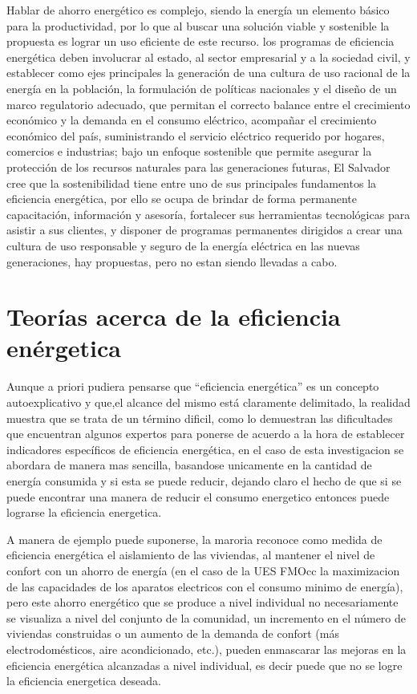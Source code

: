 \documentclass[12pt,letterpaper]{report}
\begin{document}
Hablar de ahorro energético es complejo, siendo la energía un elemento básico para la productividad, por lo que al buscar una solución viable y sostenible la propuesta es lograr un uso eficiente de este recurso. los programas de eficiencia energética deben involucrar al estado, al sector empresarial y a la sociedad civil, y establecer como ejes principales la generación de una cultura de uso racional de la energía en la población, la formulación de políticas nacionales y el diseño de un marco regulatorio adecuado, que permitan el correcto balance entre el crecimiento económico y la demanda en el consumo eléctrico, acompañar el crecimiento económico del país, suministrando el servicio eléctrico requerido por hogares, comercios e industrias; bajo un enfoque sostenible que permite asegurar la protección de los recursos naturales para las generaciones futuras, El Salvador cree que la sostenibilidad tiene entre uno de sus principales fundamentos la eficiencia energética, por ello se ocupa de brindar de forma permanente capacitación, información y asesoría, fortalecer sus herramientas tecnológicas para asistir a sus clientes, y disponer de programas permanentes dirigidos a crear una cultura de uso responsable y seguro de la energía eléctrica en las nuevas generaciones, hay propuestas, pero no estan siendo llevadas a cabo.\cite{MIESA}

\section{Teorías acerca de la eficiencia enérgetica}

Aunque a priori pudiera pensarse que “eficiencia energética” es un concepto
autoexplicativo y que,el alcance del mismo está claramente
delimitado, la realidad muestra que se trata de un término dificil, como lo
demuestran las dificultades que encuentran algunos expertos para ponerse de
acuerdo a la hora de establecer indicadores específicos de eficiencia
energética, en el caso de esta investigacion se abordara de manera mas sencilla, basandose unicamente en la cantidad de energía consumida y si esta se puede reducir, dejando claro el hecho de que si se puede encontrar una manera de reducir el consumo energetico entonces puede lograrse la eficiencia energetica.

A manera de ejemplo puede suponerse, la maroria reconoce como
medida de eficiencia energética el aislamiento de las viviendas, al mantener el
nivel de confort con un ahorro de energía (en el caso de la UES FMOcc la maximizacion de las capacidades de los aparatos electricos con el consumo minimo de energía), pero este ahorro energético que se
produce a nivel individual no necesariamente se visualiza a nivel del conjunto
de la comunidad, un incremento en el número de viviendas construidas o un
aumento de la demanda de confort (más electrodomésticos, aire
acondicionado, etc.), pueden enmascarar las mejoras en la eficiencia
energética alcanzadas a nivel individual, es decir puede que no se logre la eficiencia energetica deseada. 
\end{document}
